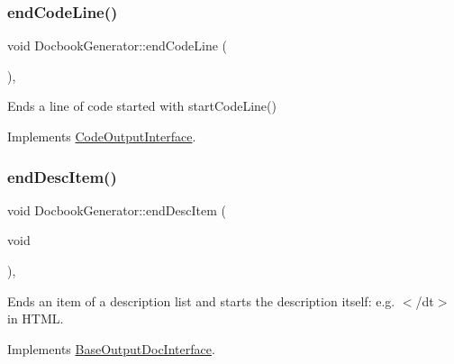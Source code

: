 \mbox{\label{class_docbook_generator_a8f7445243e87fede91ba577d5549b907}} 
\subsubsection{\texorpdfstring{endCodeLine()}{endCodeLine()}}
{\footnotesize\ttfamily void Docbook\+Generator\+::end\+Code\+Line (\begin{DoxyParamCaption}{ }\end{DoxyParamCaption})\hspace{0.3cm}{\ttfamily [inline]}, {\ttfamily [virtual]}}

Ends a line of code started with start\+Code\+Line() 

Implements \mbox{\hyperlink{class_code_output_interface_afac5763eafc78f93b82691fb9a6dcff7}{Code\+Output\+Interface}}.

\mbox{\label{class_docbook_generator_ae46437543719a73a35d0202749633c15}} 
\subsubsection{\texorpdfstring{endDescItem()}{endDescItem()}}
{\footnotesize\ttfamily void Docbook\+Generator\+::end\+Desc\+Item (\begin{DoxyParamCaption}\item[{void}]{ }\end{DoxyParamCaption})\hspace{0.3cm}{\ttfamily [inline]}, {\ttfamily [virtual]}}

Ends an item of a description list and starts the description itself\+: e.\+g. {\ttfamily $<$/dt$>$} in H\+T\+ML. 

Implements \mbox{\hyperlink{class_base_output_doc_interface_a09e3aa9d3faac55b2cc9290eaa69f55b}{Base\+Output\+Doc\+Interface}}.

\mbox{\label{class_docbook_generator_accbb80f6730221e3396f38cbb07ed7b5}} 
